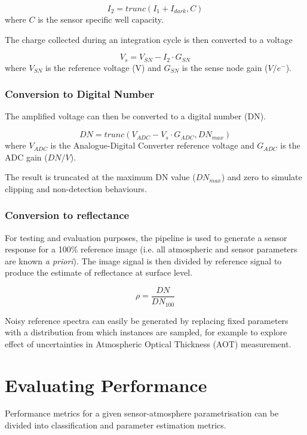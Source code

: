 \documentclass[10pt,a4paper,final,twocolumn]{article}
\begin{document}
\begin{equation}
I_2 = trunc(I_1+I_{dark}, C)
\end{equation}
where $C$ is the sensor specific well capacity.

The charge collected during an integration cycle is then converted to a voltage

\begin{equation}
V_s = V_{SN} - I_2 \cdot G_{SN}
\end{equation}
where $V_{SN}$  is the reference voltage (V) and $G_{SN}$ is the sense node gain ($V/e^{-}$).

\subsubsection{Conversion to Digital Number}
The amplified voltage can then be converted to a digital number (DN).

\begin{equation}
DN = trunc(V_{ADC} -V_s \cdot G_{ADC}, DN_{max})
\end{equation}
where $V_{ADC}$  is the Analogue-Digital Converter reference voltage and $G_{ADC}$ is the ADC gain ($DN/V$).

The result is truncated at the maximum DN value ($DN_{max}$) and zero to simulate clipping and non-detection behaviours.

\subsubsection{Conversion to reflectance}
For testing and evaluation purposes, the pipeline is used to generate a sensor response for a 100\% reference image (i.e. all atmospheric and sensor parameters are known \textit{a priori}). The image signal is then divided by reference signal to produce the estimate of reflectance at surface level.

\begin{equation}
\rho = \frac{DN}{DN_{100}}
\end{equation}

Noisy reference spectra can easily be generated by replacing fixed parameters with a distribution from which instances are sampled, for example to explore effect of uncertainties in Atmospheric Optical Thickness (AOT) measurement.


\section{Evaluating Performance}
Performance metrics for a given sensor-atmosphere parametrisation can be divided into classification and parameter estimation metrics.
\end{document}
